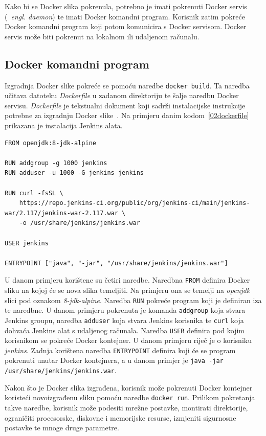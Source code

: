 Kako bi se Docker slika pokrenula, potrebno je imati pokrenuti Docker servis (~\textit{engl.
daemon}) te imati Docker komandni program. Korisnik zatim pokreće Docker komandni program koji potom
komunicira s Docker servisom. Docker servis može biti pokrenut na lokalnom ili udaljenom računalu.

\subsection{Docker komandni program}
Izgradnja Docker slike pokreće se pomoću naredbe \texttt{docker~build}. Ta naredba učitava datoteku
\textit{Dockerfile} u zadanom direktoriju te šalje naredbu Docker servisu. \textit{Dockerfile} je
tekstualni dokument koji sadrži instalacijske instrukcije potrebne za izgradnju Docker
slike~\citep{kacamarga2015lightweight}. Na primjeru danim kodom~\ref{02dockerfile} prikazana je
instalacija Jenkins alata.

\begin{lstlisting}[float=h]
FROM openjdk:8-jdk-alpine

RUN addgroup -g 1000 jenkins
RUN adduser -u 1000 -G jenkins jenkins

RUN curl -fsSL \
    https://repo.jenkins-ci.org/public/org/jenkins-ci/main/jenkins-war/2.117/jenkins-war-2.117.war \
    -o /usr/share/jenkins/jenkins.war

USER jenkins

ENTRYPOINT ["java", "-jar", "/usr/share/jenkins/jenkins.war"]
\end{lstlisting}

U danom primjeru korištene su četiri naredbe. Naredbna \texttt{FROM} definira Docker sliku na kojoj
će se nova slika temeljiti. Na primjeru ona se temelji na \textit{openjdk} slici pod oznakom
\textit{8-jdk-alpine}. Naredba \texttt{RUN} pokreće program koji je definiran iza te naredbne. U
danom primjeru pokrenuta je komanda \texttt{addgroup} koja stvara Jenkins groupu, naredba
\texttt{adduser} koja stvara Jenkins korisnika te \texttt{curl} koja dohvaća Jenkins alat s
udaljenog računala.  Naredba \texttt{USER} definira pod kojim korisnikom se pokreće Docker
kontejner. U danom primjeru riječ je o  korisniku \textit{jenkins}. Zadnja korištena naredba
\texttt{ENTRYPOINT} definira koji će se program pokrenuti unutar Docker kontejnera, a u danom
primjer je \texttt{java -jar /usr/share/jenkins/jenkins.war}.

Nakon što je Docker slika izgrađena, korisnik može pokrenuti Docker kontejner koristeći
novoizgrađenu sliku pomoću naredbe \texttt{docker~run}. Prilikom pokretanja takve naredbe, korisnik
može podesiti mrežne postavke, montirati direktorije, ograničiti procesorske, diskovne i memorijske
resurse, izmjeniti sigurnosne postavke te mnoge druge parametre.

